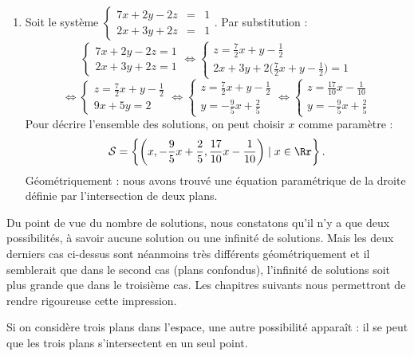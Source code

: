 \documentclass[class=report,crop=false]{standalone}
\begin{document}
\begin{exemple}
\begin{enumerate}
  \item Soit le système $\left\{\begin{array}{rcl}
7 x + 2 y - 2 z  & = & 1 \\
2 x + 3 y + 2 z  & = & 1
 \end{array}\right.$.
 Par substitution :
$$\left\{\begin{array}{l}
7 x + 2 y - 2 z   =  1 \\
2 x + 3 y + 2 z   =  1
 \end{array}\right. \iff
\left\{\begin{array}{l}
z   = \frac72 x + y -\frac12 \\
2 x + 3 y + 2 \big( \frac72 x + y -\frac12 \big)   =  1
 \end{array}\right. $$
$$\iff
\left\{\begin{array}{l}
z   = \frac72 x + y -\frac12 \\
9 x + 5 y    =  2
 \end{array}\right.   \iff
\left\{\begin{array}{l}
z = \frac72 x + y -\frac12 \\
y =  -\frac{9}{5} x +  \frac25
 \end{array}\right.
 \iff
\left\{\begin{array}{l}
z = \frac{17}{10}x-\frac{1}{10} \\
y =  -\frac{9}{5} x +  \frac25
 \end{array}\right.
 $$
Pour décrire l’ensemble des solutions, on peut choisir $x$ comme paramètre :
 $$\mathcal{S}= \left\lbrace \left(x,-\frac{9}{5} x +  \frac25,\frac{17}{10}x-\frac{1}{10}\right) \mid x\in \Rr \right\rbrace.$$
Géométriquement : nous avons trouvé une équation paramétrique de la droite
définie par l'intersection de deux plans.
\end{enumerate}


\end{exemple}

Du point de vue du nombre de solutions, nous constatons qu'il n'y a
que deux possibilités,
à savoir aucune solution ou une infinité de solutions. Mais les deux
derniers cas ci-dessus sont néanmoins très différents géométriquement et
il semblerait que dans le second cas (plans confondus), l'infinité de solutions
soit plus grande que dans le troisième cas. Les chapitres suivants nous permettront
de rendre rigoureuse cette impression.

Si on considère trois plans dans l'espace, une autre possibilité apparaît :
il se peut que les trois plans s'intersectent en un seul point.
\end{document}
